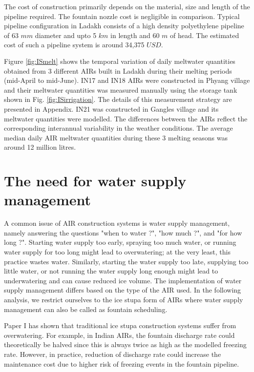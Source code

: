 The cost of construction primarily depends on the material, size and length of the pipeline required. The
fountain nozzle cost is negligible in comparison. Typical pipeline configuration in Ladakh consists of a high
density polyethylene pipeline of 63 $mm$ diameter and upto 5 $km$ in length and 60 $m$ of head. The estimated cost of
such a pipeline system is around 34,375 $USD$.

Figure \ref{fig:ISmelt} shows the temporal variation of daily meltwater quantities obtained from 3 different AIRs
built in Ladakh during their melting periods (mid-April to mid-June). IN17 and IN18 AIRs were constructed in
Phyang village and their meltwater quantities was measured manually using the storage tank shown in Fig.
\ref{fig:ISirrigation}. The details of this measurement strategy are presented in Appendix. IN21 was constructed
in Gangles village and its meltwater quantities were modelled. The differences between the AIRs reflect the
corresponding interannual variability in the weather conditions. The average median daily AIR meltwater
quantities during these 3 melting seasons was around 12 million litres.   

\section{The need for water supply management}

A common issue of AIR construction systems is water supply management, namely answering the questions "when to
water ?", "how much ?", and "for how long ?". Starting water supply too early, spraying too much water, or
running water supply for too long might lead to overwatering; at the very least, this practice wastes water.
Similarly, starting the water supply too late, supplying too little water, or not running the water supply long
enough might lead to underwatering and can cause reduced ice volume. The implementation of water supply management
differs based on the type of the AIR used. In the following analysis, we restrict ourselves to the ice stupa
form of AIRs where water supply management can also be called as fountain scheduling.

Paper I has shown that traditional ice stupa construction systems suffer from overwatering. For example, in
Indian AIRs, the fountain discharge rate could theoretically be halved since this is always twice as high as the
modelled freezing rate. However, in practice, reduction of discharge rate could increase the maintenance cost
due to higher risk of freezing events in the fountain pipeline.

